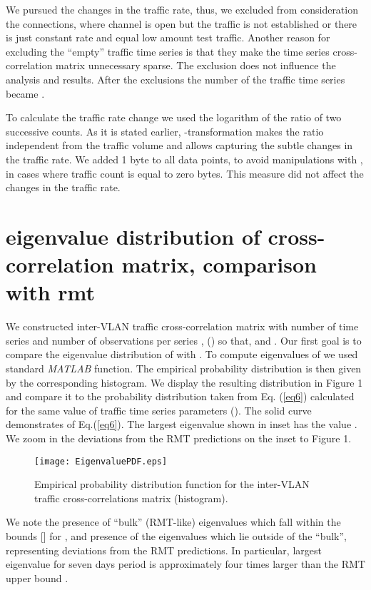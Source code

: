 \documentclass{IEEEtran}
\begin{document}
We pursued the changes in the traffic rate, thus, we excluded from
consideration the connections, where channel is open but the traffic
is not established or there is just constant rate and equal low amount
test traffic. Another reason for excluding the {}``empty'' traffic
time series is that they make the time series cross-correlation matrix
unnecessary sparse. The exclusion does not influence the analysis
and results. After the exclusions the number of the traffic time series
became . 

To calculate the traffic rate change  we used
the logarithm of the ratio of two successive counts. As it is stated
earlier, -transformation makes the ratio independent from the
traffic volume and allows capturing the subtle changes in the traffic
rate. We added 1 byte to all data points, to avoid manipulations with
, in cases where traffic count is equal to zero
bytes. This measure did not affect the changes in the traffic rate. 


\section{eigenvalue distribution of cross-correlation matrix, comparison with
rmt}

We constructed inter-VLAN traffic cross-correlation matrix  with
number of time series  and number of observations per series
, () so that,  and .
Our first goal is to compare the eigenvalue distribution 
of  with  \cite{Laloux}. To compute
eigenvalues of  we used standard \emph{MATLAB} function. The empirical
probability distribution  is then given by
the corresponding histogram. We display the resulting distribution
 in Figure 1 and compare it to the probability
distribution  taken from Eq. (\ref{eq6})
calculated for the same value of traffic time series parameters ().
The solid curve demonstrates  of Eq.(\ref{eq6}).
The largest eigenvalue shown in inset has the value .
We zoom in the deviations from the RMT predictions on the inset to
Figure 1. \begin{figure}[H]
\begin{center}\texttt{[image: EigenvaluePDF.eps]}\end{center}


\caption{\label{1} Empirical probability distribution function 
for the inter-VLAN traffic cross-correlations matrix  (histogram). }
\end{figure}
We note the presence of {}``bulk'' (RMT-like) eigenvalues which
fall within the bounds {[}{]} for ,
and presence of the eigenvalues which lie outside of the {}``bulk'',
representing deviations from the RMT predictions. In particular, largest
eigenvalue  for seven days period is approximately
four times larger than the RMT upper bound .
\end{document}
